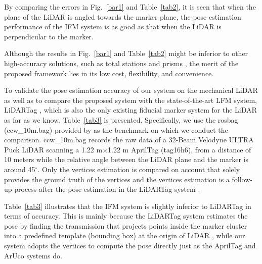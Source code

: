 By comparing the errors in Fig.~\ref{bar1} and Table~\ref{tab2}, it is seen that when the plane of the LiDAR is angled towards the marker plane, the pose estimation performance of the IFM system is as good as that when the LiDAR is perpendicular to the marker.
\par
Although the results in Fig.~\ref{bar1} and Table~\ref{tab2} might be inferior to other high-accuracy solutions, such as total stations and prisms \cite{station}, the merit of the proposed framework lies in its low cost, flexibility, and convenience.
\par
To validate the pose estimation accuracy of our system on the mechanical LiDAR as well as to compare the proposed system with the state-of-the-art LFM system, LiDARTag \cite{lt}, which is also the only existing fiducial marker system for the LiDAR as far as we know, Table~\ref{tab3} is presented. Specifically, we use the rosbag (ccw\_10m.bag) provided by \cite{lt} as the benchmark on which we conduct the comparison. ccw\_10m.bag records the raw data of a 32-Beam Velodyne ULTRA Puck LiDAR scanning a 1.22 m$\times$1.22 m AprilTag (tag16h6), from a distance of 10 meters while the relative angle between the LiDAR plane and the marker is around 45$^{\circ}$. Only the vertices estimation is compared on account that \cite{lt} solely provides the ground truth of the vertices and the vertices estimation is a follow-up process after the pose estimation in the LiDARTag system \cite{lt,lt2}. 
\par
Table~\ref{tab3} illustrates that the IFM system is slightly inferior to LiDARTag in terms of accuracy. This is mainly because the LiDARTag system estimates the pose by finding the transmission that projects points inside the marker cluster into a predefined template (bounding box) at the origin of LiDAR \cite{lt,lt2}, while our system adopts the vertices to compute the pose directly just as the AprilTag \cite{ap3} and ArUco \cite{aruco} systems do. \par
